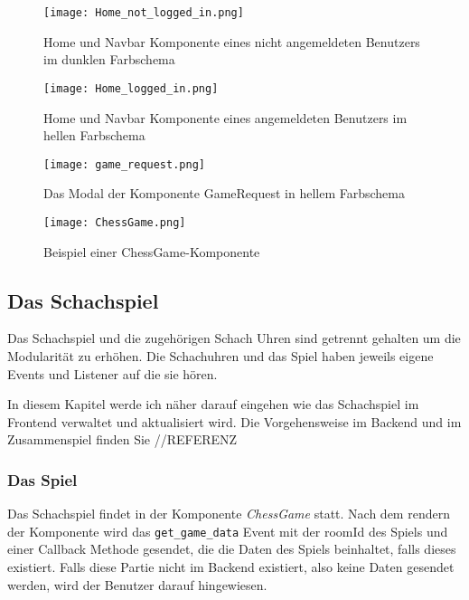   \begin{figure}[htbp]
  \centering
  \texttt{[image: Home\_not\_logged\_in.png]}
  \caption{Home und Navbar Komponente eines nicht angemeldeten Benutzers im dunklen Farbschema}
  \label{fig:home-not-logged-in}
\end{figure}

  
    \begin{figure}[htbp]
    \centering
  \texttt{[image: Home\_logged\_in.png]}
  \caption{Home und Navbar Komponente eines angemeldeten Benutzers im hellen Farbschema}
  \label{fig:home-logged-in}
\end{figure}

      \begin{figure}[htbp]
      \centering
  \texttt{[image: game\_request.png]}
  \caption{Das Modal der Komponente GameRequest in hellem Farbschema}
  \label{fig:game-request}
\end{figure}

      \begin{figure}[htbp]
      \centering
  \texttt{[image: ChessGame.png]}
  \caption{Beispiel einer ChessGame-Komponente}
  \label{fig:chess-game}
\end{figure}
        

    
   
        
        
        \subsection{Das Schachspiel}
        \label{sec:Schachspiel}
Das Schachspiel und die zugehörigen Schach Uhren sind getrennt gehalten um die Modularität zu erhöhen. Die Schachuhren und das Spiel haben jeweils eigene Events und Listener auf die sie hören.

In diesem Kapitel werde ich näher darauf eingehen wie das Schachspiel im Frontend verwaltet und aktualisiert wird. Die Vorgehensweise im Backend und im Zusammenspiel finden Sie //REFERENZ
        \subsubsection{Das Spiel}
Das Schachspiel findet in der Komponente \textit{ChessGame} statt.
Nach dem rendern der Komponente wird das \verb|get_game_data| Event mit der roomId des Spiels und einer Callback Methode gesendet, die die Daten des Spiels beinhaltet, falls dieses existiert. Falls diese Partie nicht im Backend existiert, also keine Daten gesendet werden, wird der Benutzer darauf hingewiesen.

